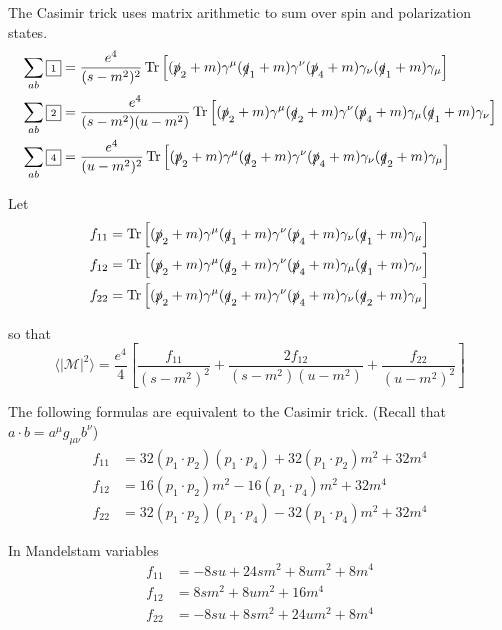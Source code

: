 The Casimir trick uses matrix arithmetic to sum over spin and polarization states.
\begin{align*}
\sum_{ab}{\boxed{\scriptstyle1}}&=\frac{e^4}{(s-m^2)^2}\operatorname{Tr}
\left[
(\slashed p_2+m)\gamma^\mu(\slashed q_1+m)\gamma^\nu(\slashed p_4+m)\gamma_\nu(\slashed q_1+m)\gamma_\mu
\right]
\\
\sum_{ab}{\boxed{\scriptstyle2}}&=\frac{e^4}{(s-m^2)(u-m^2)}\operatorname{Tr}
\left[
(\slashed p_2+m)\gamma^\mu(\slashed q_2+m)\gamma^\nu(\slashed p_4+m)\gamma_\mu(\slashed q_1+m)\gamma_\nu
\right]
\\
\sum_{ab}{\boxed{\scriptstyle4}}&=\frac{e^4}{(u-m^2)^2}\operatorname{Tr}
\left[
(\slashed p_2+m)\gamma^\mu(\slashed q_2+m)\gamma^\nu(\slashed p_4+m)\gamma_\nu(\slashed q_2+m)\gamma_\mu
\right]
\end{align*}

Let
\begin{align*}
f_{11}&=\operatorname{Tr}
\left[
(\slashed p_2+m)\gamma^\mu(\slashed q_1+m)\gamma^\nu(\slashed p_4+m)\gamma_\nu(\slashed q_1+m)\gamma_\mu
\right]
\\
f_{12}&=\operatorname{Tr}
\left[
(\slashed p_2+m)\gamma^\mu(\slashed q_2+m)\gamma^\nu(\slashed p_4+m)\gamma_\mu(\slashed q_1+m)\gamma_\nu
\right]
\\
f_{22}&=\operatorname{Tr}
\left[
(\slashed p_2+m)\gamma^\mu(\slashed q_2+m)\gamma^\nu(\slashed p_4+m)\gamma_\nu(\slashed q_2+m)\gamma_\mu
\right]
\end{align*}

so that
\begin{equation*}
\langle|\mathcal{M}|^2\rangle=\frac{e^4}{4}
\left[
\frac{f_{11}}{(s-m^2)^2}+\frac{2f_{12}}{(s-m^2)(u-m^2)}+\frac{f_{22}}{(u-m^2)^2}
\right]
\end{equation*}

The following formulas are equivalent to the Casimir trick.
(Recall that $a\cdot b=a^\mu g_{\mu\nu}b^\nu$)
\begin{align*}
f_{11}&=32 (p_1\cdot p_2) (p_1\cdot p_4) + 32 (p_1\cdot p_2) m^2 + 32 m^4
\\
f_{12}&=16 (p_1\cdot p_2) m^2 - 16 (p_1\cdot p_4) m^2 + 32 m^4
\\
f_{22}&=32 (p_1\cdot p_2) (p_1\cdot p_4) - 32 (p_1\cdot p_4) m^2 + 32 m^4
\end{align*}

In Mandelstam variables
\begin{equation*}
\begin{aligned}
f_{11}&=-8 s u + 24 s m^2 + 8 u m^2 + 8 m^4
\\
f_{12}&=8 s m^2 + 8 u m^2 + 16 m^4
\\
f_{22}&=-8 s u + 8 s m^2 + 24 u m^2 + 8 m^4
\end{aligned}
\tag{2}
\end{equation*}

